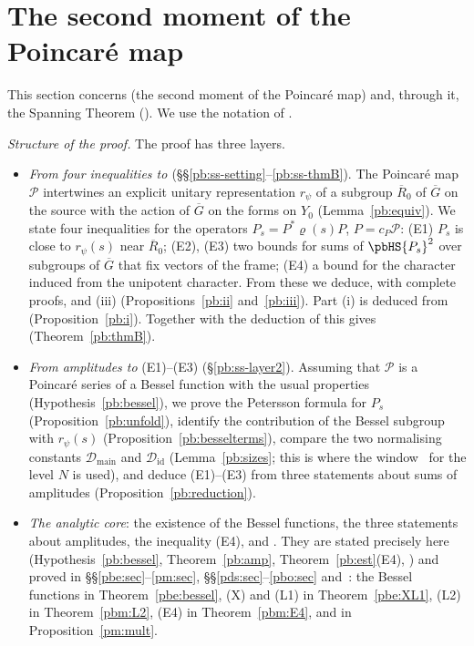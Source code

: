 \documentclass[10pt]{amsart}
\theoremstyle{definition}
\theoremstyle{remark}
\providecommand{\auG}{\overline G}
\providecommand{\auP}{\mathcal P}
\providecommand{\pbDid}{\mathcal D_{\mathrm{id}}}
\providecommand{\pbDmain}{\mathcal D_{\mathrm{main}}}
\providecommand{\pbR}{\overline R_0}
\providecommand{\pbrpsi}{r_\psi}
\begin{document}
\section{The second moment of the Poincar\'e map}\label{pb:sec}

This section concerns {\cite[Proposition~14.32]{P46}} (the second moment of the Poincar\'e map) and,
through it, the Spanning Theorem ({\cite[Theorem~14.14]{P46}}). We use the notation of {\cite[\S\S14.1--14.3]{P46}}.

\emph{Structure of the proof.} The proof has three layers.
\begin{itemize}
\item[(I)] \emph{From four inequalities to {\cite[Theorem~14.14]{P46}}} (\S\S\ref{pb:ss-setting}--\ref{pb:ss-thmB}).
The Poincar\'e map $\auP$ intertwines an explicit unitary representation $\pbrpsi$ of a subgroup
$\pbR$ of $\auG$ on the source with the action of $\auG$ on the forms on $Y_0$
(Lemma~\ref{pb:equiv}). We state four inequalities for the operators
$P_s=P^*\varrho(s)P$, $P=c_P\auP$: \textup{(E1)} $P_s$ is close to $\pbrpsi(s)$ near $\pbR$;
\textup{(E2)}, \textup{(E3)} two bounds for sums of $\pbHS{P_s}^2$ over subgroups of $\auG$ that fix
vectors of the frame; \textup{(E4)} a bound for the character induced from the unipotent
character. From these we deduce, with complete proofs,
{\cite[Proposition~14.32(ii)]{P46}} and (iii) (Propositions~\ref{pb:ii} and~\ref{pb:iii}). Part (i) is
deduced from {\cite[Proposition~14.36]{P46}} (Proposition~\ref{pb:i}). Together with the deduction of
{\cite[\S14.7]{P46}} this gives {\cite[Theorem~14.14]{P46}} (Theorem~\ref{pb:thmB}).
\item[(II)] \emph{From amplitudes to} (E1)--(E3) (\S\ref{pb:ss-layer2}). Assuming that $\auP$ is
a Poincar\'e series of a Bessel function with the usual properties
(Hypothesis~\ref{pb:bessel}), we prove the Petersson formula for $P_s$
(Proposition~\ref{pb:unfold}), identify the contribution of the Bessel subgroup with $\pbrpsi(s)$
(Proposition~\ref{pb:besselterms}), compare the two normalising constants $\pbDmain$ and $\pbDid$
(Lemma~\ref{pb:sizes}; this is where the window~{\cite[(37)]{P46}} for the level $N$ is used),
and deduce (E1)--(E3) from three statements about sums of amplitudes
(Proposition~\ref{pb:reduction}).
\item[(III)] \emph{The analytic core}: the existence of the Bessel functions, the three statements
about amplitudes, the inequality (E4), and {\cite[Proposition~14.36]{P46}}. They are stated precisely here
(Hypothesis~\ref{pb:bessel}, Theorem~\ref{pb:amp}, Theorem~\ref{pb:est}(E4), {\cite[Proposition~14.36]{P46}})
and proved in \S\S\ref{pbe:sec}--\ref{pm:sec}, \S\S\ref{pds:sec}--\ref{pbo:sec} and~{\cite[\S\S2--6]{P52}}: the Bessel functions in Theorem~\ref{pbe:bessel},
\textup{(X)} and \textup{(L1)} in Theorem~\ref{pbe:XL1}, \textup{(L2)} in Theorem~\ref{pbm:L2},
\textup{(E4)} in Theorem~\ref{pbm:E4}, and {\cite[Proposition~14.36]{P46}} in Proposition~\ref{pm:mult}.
\end{itemize}
\end{document}
